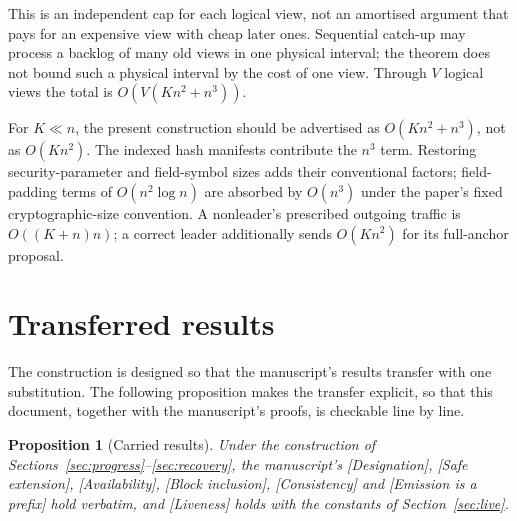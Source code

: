 \documentclass[11pt,a4paper]{article}
\newtheorem{proposition}[theorem]{Proposition}
\theoremstyle{definition}
\begin{document}
This is an independent cap for each logical view, not an amortised argument
that pays for an expensive view with cheap later ones. Sequential catch-up
may process a backlog of many old views in one physical interval; the
theorem does not bound such a physical interval by the cost of one view.
Through \(V\) logical views the total is \(O(V(Kn^2+n^3))\).

For \(K\ll n\), the present construction should be advertised as
\(O(Kn^2+n^3)\), not as \(O(Kn^2)\). The indexed hash manifests contribute
the \(n^3\) term. Restoring security-parameter and field-symbol sizes adds
their conventional factors; field-padding terms of \(O(n^2\log n)\) are
absorbed by \(O(n^3)\) under the paper's fixed cryptographic-size convention.
A nonleader's prescribed outgoing traffic is \(O((K+n)n)\); a correct
leader additionally sends \(O(Kn^2)\) for its full-anchor proposal.

\section{Transferred results}\label{sec:transfer}

The construction is designed so that the manuscript's results
transfer with one substitution. The following proposition makes
the transfer explicit, so that this document, together with the
manuscript's proofs, is checkable line by line.

\begin{proposition}[Carried results]\label{prop:carry}
Under the construction of
Sections~\ref{sec:progress}--\ref{sec:recovery}, the
manuscript's [Designation], [Safe extension], [Availability],
[Block inclusion], [Consistency] and [Emission is a prefix] hold
verbatim, and [Liveness] holds with the constants of
Section~\ref{sec:live}.
\end{proposition}
\end{document}
